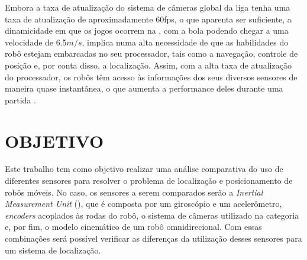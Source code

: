 \documentclass[acronym, symbols, table]{fei}
\begin{document}
	Embora a taxa de atualização do sistema de câmeras global da liga tenha uma taxa de atualização de aproximadamente 60fps, o que aparenta ser suficiente, a dinamicidade em que os jogos ocorrem na , com a bola podendo chegar a uma velocidade de 6.5$m/s$, implica numa alta necessidade de que as habilidades do robô estejam embarcadas no seu processador, tais como a navegação, controle de posição e, por conta disso, a localização. Assim, com a alta taxa de atualização do processador, os robôs têm acesso às informações dos seus diversos sensores de maneira quase instantânea, o que aumenta a performance deles durante uma partida \cite{ubc_thunderbots_2015}.

%	
	

%	
	
	\section{OBJETIVO}
	
		Este trabalho tem como objetivo realizar uma análise comparativa do uso de diferentes sensores para resolver o problema de localização e posicionamento de robôs móveis. No caso, os sensores a serem comparados serão a \textit{Inertial Measurement Unit} (), que é composta por um giroscópio e um acelerômetro, \textit{encoders} acoplados às rodas do robô, o sistema de câmeras utilizado na categoria  e, por fim, o modelo cinemático de um robô omnidirecional. Com essas combinações será possível verificar as diferenças da utilização desses sensores para um sistema de localização.
	
\end{document}
